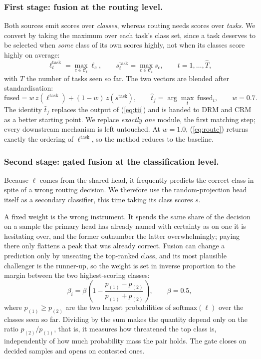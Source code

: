 \documentclass[runningheads]{llncs}
\begin{document}
\subsubsection{First stage: fusion at the routing level.}
Both sources emit scores over \emph{classes}, whereas routing needs scores over
\emph{tasks}. We convert by taking the maximum over each task's class set, since
a task deserves to be selected when \emph{some} class of its own scores highly,
not when its classes score highly on average:
\begin{equation}
\ell^{\mathrm{task}}_t = \max_{c \in \mathcal{C}_t} \ell_c ,
\qquad
s^{\mathrm{task}}_t = \max_{c \in \mathcal{C}_t} s_c ,
\qquad t = 1,\dots,\hat{T},
\label{eq:taskscore}
\end{equation}
with $\hat{T}$ the number of tasks seen so far. The two vectors are blended
after standardisation:
\begin{equation}
\mathrm{fused} = w\, z(\ell^{\mathrm{task}}) + (1-w)\, z(s^{\mathrm{task}}),
\qquad
\hat{t}_f = \arg\max_t\, \mathrm{fused}_t ,
\qquad w = 0.7 .
\label{eq:route}
\end{equation}
The identity $\hat{t}_f$ replaces the output of (\ref{eq:tii}) and is handed to
DRM and CRM as a better starting point. We replace \emph{exactly one} module, the
first matching step; every downstream mechanism is left untouched. At $w = 1.0$,
(\ref{eq:route}) returns exactly the ordering of $\ell^{\mathrm{task}}$, so the
method reduces to the baseline.

\subsubsection{Second stage: gated fusion at the classification level.}
Because $\ell$ comes from the shared head, it frequently predicts the correct
class in spite of a wrong routing decision. We therefore use the
random-projection head itself as a secondary classifier, this time taking its
class scores $s$.

A fixed weight is the wrong instrument. It spends the same share of the decision
on a sample the primary head has already named with certainty as on one it is
hesitating over, and the former outnumber the latter overwhelmingly; paying there
only flattens a peak that was already correct. Fusion can change a prediction
only by unseating the top-ranked class, and its most plausible challenger is the
runner-up, so the weight is set in inverse proportion to the margin between the
two highest-scoring classes:
\begin{equation}
\beta_i = \beta \left( 1 - \frac{p_{(1)} - p_{(2)}}{p_{(1)} + p_{(2)}} \right),
\qquad \beta = 0.5 ,
\label{eq:gate}
\end{equation}
where $p_{(1)} \geq p_{(2)}$ are the two largest probabilities of
$\mathrm{softmax}(\ell)$ over the classes seen so far. Dividing by the sum makes
the quantity depend only on the ratio $p_{(2)}/p_{(1)}$, that is, it measures how
threatened the top class is, independently of how much probability mass the pair
holds. The gate closes on decided samples and opens on contested ones.
\end{document}
